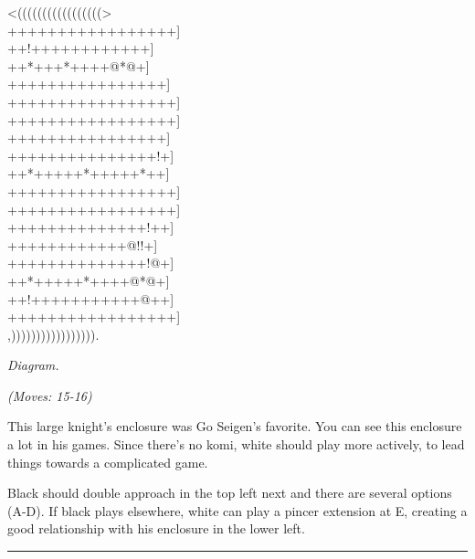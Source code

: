 \documentclass[letterpaper,12pt]{memoir}
\newcounter{GoFigure}[part]
\newcommand{\gofigure}{%
 \stepcounter{GoFigure}
 \centerline{\textit{Diagram.\thinspace\arabic{GoFigure}}}
}
\newcommand{\subtext}[1]{\centerline{\textit{#1}}}
\begin{document}
\begin{minipage}[t]{240pt}
{\gnos
<(((((((((((((((((>\\
+++++++++++++++++]\\
++!++++++++++++]\\
++*+++*++++@*@+]\\
++++++++++++++++]\\
+++++++++++++++++]\\
+++++++++++++++++]\\
++++++++++++++++]\\
+++++++++++++++!+]\\
++*+++++*+++++*++]\\
+++++++++++++++++]\\
+++++++++++++++++]\\
++++++++++++++!++]\\
++++++++++++@!!+]\\
++++++++++++++!@+]\\
++*+++++*++++@*@+]\\
++!+++++++++++@++]\\
+++++++++++++++++]\\
,))))))))))))))))).\\
}
\gofigure

\subtext{(Moves: 15-16)}
\end{minipage}
\begin{minipage}[t]{268.19999999999993pt}
\setlength{\parskip}{0.5em}
This large knight's enclosure was Go Seigen's favorite. You can see this enclosure a lot in his games. Since there's no komi, white should play more actively, to lead things towards a complicated game.

Black should double approach in the top left next and there are several options (A-D). If black plays elsewhere, white can play a pincer extension at E, creating a good relationship with his enclosure in the lower left.


\end{minipage}
\vfill

\rule{\textwidth}{0.5pt}
\end{document}
